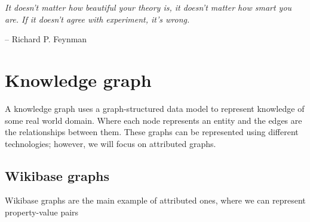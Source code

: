 \epigraph{\textit{It doesn't matter how beautiful your theory is, it doesn't matter how smart you are. If it doesn't agree with experiment, it's wrong.}}{-- \textup{Richard P. Feynman }}



\section{Knowledge graph}

A knowledge graph uses a graph-structured data model to represent knowledge of some real world domain. Where each node represents an entity and the edges are the relationships between them. These graphs can be represented using different technologies; however, we will focus on attributed graphs.

\subsection{Wikibase graphs}

Wikibase graphs are the main example of attributed ones, where we can represent property-value pairs